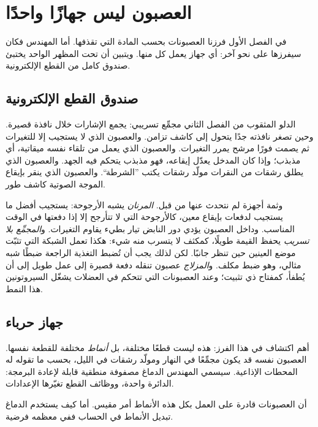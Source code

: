 \chapter{العصبون ليس جهازًا واحدًا}

في الفصل الأول فرزنا العصبونات بحسب المادة التي تقذفها. أما المهندس فكان سيفرزها على نحو آخر: أي جهاز يعمل كل منها. ويتبين أن تحت المظهر الواحد يختبئ صندوق كامل من القطع الإلكترونية.

\section*{صندوق القطع الإلكترونية}

الدلو المثقوب من الفصل الثاني مجمِّع تسريبي: يجمع الإشارات خلال نافذة قصيرة. وحين تصغر نافذته جدًا يتحول إلى كاشف تزامن. والعصبون الذي لا يستجيب إلا للتغيرات ثم يصمت فورًا مرشح يمرر التغيرات. والعصبون الذي يعمل من تلقاء نفسه ميقاتية، أي مذبذب؛ وإذا كان المدخل يعدّل إيقاعه، فهو مذبذب يتحكم فيه الجهد. والعصبون الذي يطلق رشقات من النقرات مولّد رشقات يكتب ”الشرطة“. والعصبون الذي ينقر بإيقاع الموجة الصوتية كاشف طور.


وثمة أجهزة لم نتحدث عنها من قبل. \emph{المرنان} يشبه الأرجوحة: يستجيب أفضل ما يستجيب لدفعات بإيقاع معين، كالأرجوحة التي لا تتأرجح إلا إذا دفعتها في الوقت المناسب. وداخل العصبون يؤدي دور النابض تيار بطيء يقاوم التغيرات. و\emph{المجمِّع بلا تسريب} يحفظ القيمة طويلًا، كمكثف لا يتسرب منه شيء: هكذا تعمل الشبكة التي تثبّت موضع العينين حين تنظر جانبًا. لكن لذلك يجب أن تُضبط التغذية الراجعة ضبطًا شبه مثالي، وهو ضبط مكلف. و\emph{المزلاج} عصبون تنقله دفعة قصيرة إلى عمل طويل إلى أن يُطفأ، كمفتاح ذي تثبيت؛ وعند العصبونات التي تتحكم في العضلات يشغّل السيروتونين هذا النمط.

\section*{جهاز حرباء}

أهم اكتشاف في هذا الفرز: هذه ليست قطعًا مختلفة، بل \emph{أنماط} مختلفة للقطعة نفسها. العصبون نفسه قد يكون مجمِّعًا في النهار ومولّد رشقات في الليل، بحسب ما تقوله له المحطات الإذاعية. سيسمي المهندس الدماغ مصفوفة منطقية قابلة لإعادة البرمجة: الدائرة واحدة، ووظائف القطع تغيّرها الإعدادات.

أن العصبونات قادرة على العمل بكل هذه الأنماط أمر مقيس. أما كيف يستخدم الدماغ تبديل الأنماط في الحساب ففي معظمه فرضية.

